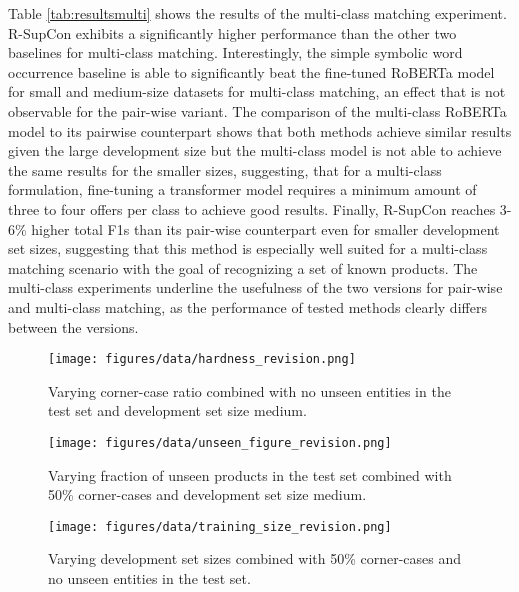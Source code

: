 \documentclass[sigconf,edbt]{acmart-edbt2024}
\begin{document}
Table \ref{tab:resultsmulti} shows the results of the multi-class matching experiment. R-SupCon exhibits a significantly higher performance than the other two baselines for multi-class matching. Interestingly, the simple symbolic word occurrence baseline is able to significantly beat the fine-tuned RoBERTa model for small and medium-size datasets for multi-class matching, an effect that is not observable for the pair-wise variant. The comparison of the multi-class RoBERTa model to its pairwise counterpart shows that both methods achieve similar results given the large development size but the multi-class model is not able to achieve the same results for the smaller sizes, suggesting, that for a multi-class formulation,
 fine-tuning a transformer model requires a minimum amount of three to four offers per class to achieve good results. Finally, R-SupCon reaches 3-6\% higher total F1s than its pair-wise counterpart even for smaller development set sizes, suggesting that this method is especially well suited for a multi-class matching scenario with the goal of recognizing a set of known products. The multi-class experiments underline the usefulness of the two versions for pair-wise and multi-class matching, as the performance of tested methods clearly differs between the versions.

\begin{figure}
  \centering
  \texttt{[image: figures/data/hardness\_revision.png]}
  \caption {Varying corner-case ratio combined with no unseen entities in the test set and development set size medium.}
  \label{fig:hardness}
\end{figure} \begin{figure}
  \centering
  \texttt{[image: figures/data/unseen\_figure\_revision.png]}
  \caption{Varying fraction of unseen products in the test set combined with 50\% corner-cases and development set size medium.}
  \label{fig:unseen}
\end{figure} \begin{figure}
  \centering
  \texttt{[image: figures/data/training\_size\_revision.png]}
  \caption{Varying development set sizes combined with 50\% corner-cases and no unseen entities in the test set.}
  \label{fig:training_size}
\end{figure} 
\end{document}
